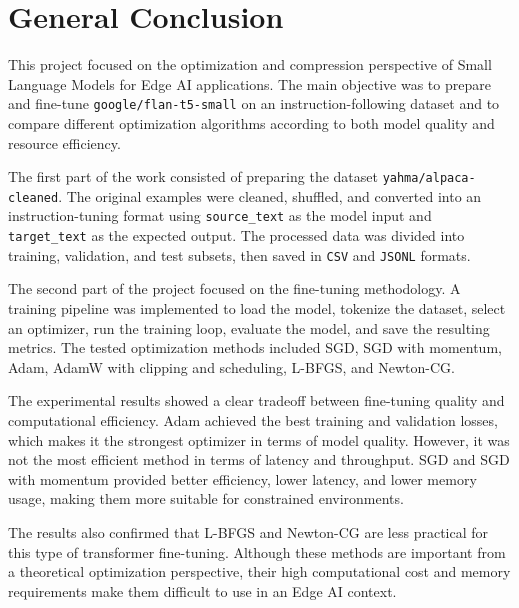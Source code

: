 \chapter{General Conclusion}

\vspace*{0.3cm}

This project focused on the optimization and compression perspective of Small
Language Models for Edge AI applications. The main objective was to prepare and
fine-tune \texttt{google/flan-t5-small} on an instruction-following dataset and
to compare different optimization algorithms according to both model quality and
resource efficiency.

\vspace*{0.15cm}

The first part of the work consisted of preparing the dataset
\texttt{yahma/alpaca-cleaned}. The original examples were cleaned, shuffled, and
converted into an instruction-tuning format using \texttt{source\_text} as the
model input and \texttt{target\_text} as the expected output. The processed data
was divided into training, validation, and test subsets, then saved in
\texttt{CSV} and \texttt{JSONL} formats.

\vspace*{0.15cm}

The second part of the project focused on the fine-tuning methodology. A training
pipeline was implemented to load the model, tokenize the dataset, select an
optimizer, run the training loop, evaluate the model, and save the resulting
metrics. The tested optimization methods included SGD, SGD with momentum, Adam,
AdamW with clipping and scheduling, L-BFGS, and Newton-CG.

\vspace*{0.15cm}

The experimental results showed a clear tradeoff between fine-tuning quality and
computational efficiency. Adam achieved the best training and validation losses,
which makes it the strongest optimizer in terms of model quality. However, it was
not the most efficient method in terms of latency and throughput. SGD and SGD with
momentum provided better efficiency, lower latency, and lower memory usage, making
them more suitable for constrained environments.

\vspace*{0.15cm}

The results also confirmed that L-BFGS and Newton-CG are less practical for this
type of transformer fine-tuning. Although these methods are important from a
theoretical optimization perspective, their high computational cost and memory
requirements make them difficult to use in an Edge AI context.

